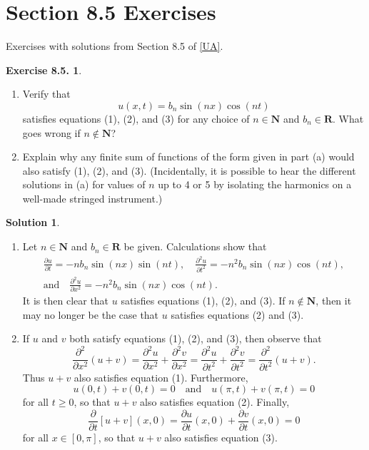 \documentclass[12pt]{article}
\theoremstyle{definition}
\theoremstyle{exercise}
\newtheorem{exercise}{Exercise 8.5.}
\theoremstyle{solution}
\newtheorem*{solution}{Solution}
\newcommand{\quand}{\quad \text{and} \quad}
\newcommand{\N}{\mathbf{N}}
\newcommand{\R}{\mathbf{R}}
\begin{document}
\section{Section 8.5 Exercises}

Exercises with solutions from Section 8.5 of \hyperlink{ua}{[UA]}.

\begin{exercise}
\label{ex:1}
    \begin{enumerate}
        \item Verify that
        \[
            u(x, t) = b_n \sin (nx) \cos (nt)
        \]
        satisfies equations (1), (2), and (3) for any choice of \( n \in \N \) and \( b_n \in \R \). What goes wrong if \( n \not\in \N \)?

        \item Explain why any finite sum of functions of the form given in part (a) would also satisfy (1), (2), and (3). (Incidentally, it is possible to hear the different solutions in (a) for values of \( n \) up to 4 or 5 by isolating the harmonics on a well-made stringed instrument.)
    \end{enumerate}
\end{exercise}

\begin{solution}
    \begin{enumerate}
        \item Let \( n \in \N \) and \( b_n \in \R \) be given. Calculations show that
        \begin{multline*}
            \frac{\partial u}{\partial t} = -n b_n \sin (nx) \sin (nt), \quad \frac{\partial^2 u}{\partial t^2} = -n^2 b_n \sin (nx) \cos (nt), \\[2mm]
            \text{and} \quad \frac{\partial^2 u}{\partial x^2} = -n^2 b_n \sin(nx) \cos(nt).
        \end{multline*}
        It is then clear that \( u \) satisfies equations (1), (2), and (3). If \( n \not\in \N \), then it may no longer be the case that \( u \) satisfies equations (2) and (3).

        \item If \( u \) and \( v \) both satisfy equations (1), (2), and (3), then observe that
        \[
            \frac{\partial^2}{\partial x^2} (u + v) = \frac{\partial^2 u}{\partial x^2} + \frac{\partial^2 v}{\partial x^2} = \frac{\partial^2 u}{\partial t^2} + \frac{\partial^2 v}{\partial t^2} = \frac{\partial^2}{\partial t^2} (u + v).
        \]
        Thus \( u + v \) also satisfies equation (1). Furthermore,
        \[
            u(0, t) + v(0, t) = 0 \quand u(\pi, t) + v(\pi, t) = 0
        \]
        for all \( t \geq 0 \), so that \( u + v \) also satisfies equation (2). Finally,
        \[
            \frac{\partial}{\partial t} [u + v](x, 0) = \frac{\partial u}{\partial t}(x, 0) + \frac{\partial v}{\partial t}(x, 0) = 0
        \]
        for all \( x \in [0, \pi] \), so that \( u + v \) also satisfies equation (3).
    \end{enumerate}
\end{solution}
\end{document}
